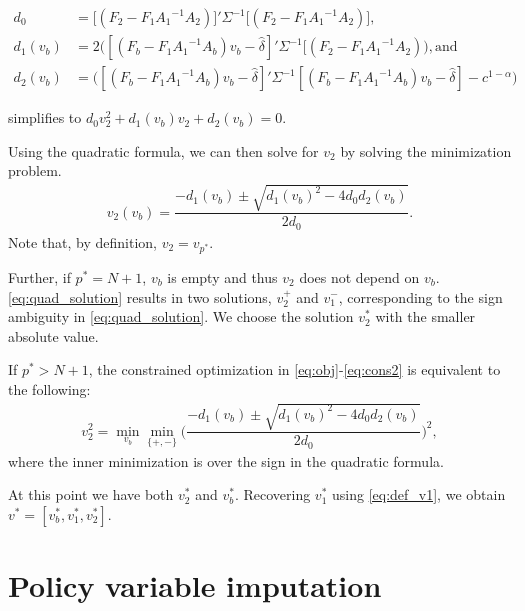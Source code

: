 \documentclass[bib]{./sty/statapress}
\begin{document}
\begin{align*}
d_0 &= \big[(F_2 - F_1 {A_1}^{-1} A_2)\big]'\Sigma ^ {-1} \big[(F_2 - F_1 {A_1}^{-1}A_2)\big], \\
d_1(v_b) &= 2 \bigg([(F_b - F_1 {A_1}^{-1}A_b) v_b - \hat{\delta}]' \Sigma ^ {-1} [(F_2 - F_1 {A_1}^{-1} A_2) \bigg), \text{and} \\
d_2(v_b) &= \bigg([(F_b - F_1 {A_1}^{-1}A_b) v_b - \hat{\delta}]' \Sigma ^ {-1} [(F_b - F_1 {A_1}^{-1}A_b) v_b - \hat{\delta}] - c^{1 - \alpha} \bigg)
\end{align*}

simplifies to $d_0 v_2^2 +  d_1(v_b) v_2 + d_2 (v_b)=0$.

Using the quadratic formula, we can then solve for $v_2$ by solving the minimization problem.
\begin{align}
\label{eq:quad_solution}
    v_2(v_b) = \dfrac{-d_1(v_b) \pm \sqrt{d_1(v_b)^2 - 4 d_0 d_2(v_b)}}{2 d_0}.
\end{align}
Note that, by definition, $v_2 = v_{p^*}$.

Further, if $p^*= N+1$, $v_b$ is empty and thus $v_2$ does not depend on $v_b$. \eqref{eq:quad_solution} results in two solutions, $v_2^+$ and $v_1^-$, corresponding to the sign ambiguity in \eqref{eq:quad_solution}. We choose the solution $v^*_2$ with the smaller absolute value.

If $p^*> N+1$, the constrained optimization in \eqref{eq:obj}-\eqref{eq:cons2} is equivalent to the following:
\begin{align}
  v^2_2 =  \min_{v_b} \min_{\{+,-\}} \bigg( \dfrac{-d_1(v_b) \pm \sqrt{d_1(v_b)^2 - 4 d_0 d_2(v_b)}}{2 d_0} \bigg)^2,\label{eq:quad_solution_min}
\end{align}
where the inner minimization is over the sign in the quadratic formula.

At this point we have both $v^*_2$ and $v^*_b$. Recovering $v^*_1$ using \eqref{eq:def_v1}, we obtain $v^*=[v^*_b, v^*_1,  v^*_2]$.


\section{Policy variable imputation}
\label{sec:impute}
\end{document}
